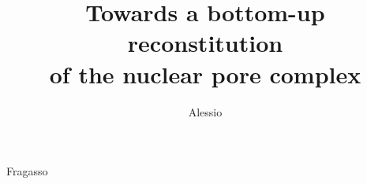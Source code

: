 \documentclass{dissertation}
\begin{document}
\title[]{Towards a bottom-up reconstitution  \\[8pt]of the nuclear pore complex}
\author{Alessio}{Fragasso}

\frontmatter



%
\tableofcontents



\mainmatter

\thumbtrue
%

%
%
%
%
%
%
%



%

%
%

\thumbfalse




 
\end{document}

